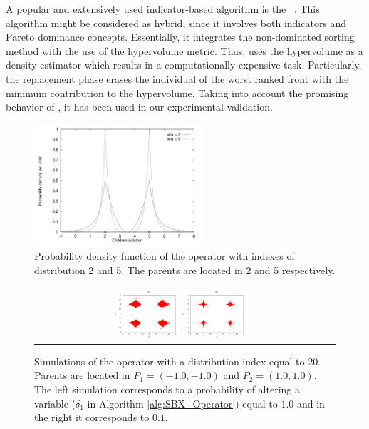 A popular and extensively used indicator-based algorithm is the \SMSEMOA{}~\cite{Joel:SMSEMOA}.
%
This algorithm might be considered as hybrid, since it involves both indicators and Pareto dominance concepts.
%
Essentially, it integrates the non-dominated sorting method with the use of the hypervolume metric.
%
Thus, \SMSEMOA{} uses the hypervolume as a density estimator which results in a computationally expensive task.
%
Particularly, the replacement phase erases the individual of the worst ranked front with the minimum contribution to the hypervolume.
%
Taking into account the promising behavior of \SMSEMOA{}, it has been used in our experimental validation.
%

\begin{figure}[!t]
\centering
\includegraphics[width=2.5in]{img/Operadores/DensitySBX_English.png}
\caption{Probability density function of the \SBX{} operator with indexes of distribution 2 and 5. The parents are located in 2 and 5 respectively.}
\label{fig:fig_sim}
\end{figure}

\begin{figure}[t]
\centering
\begin{tabular}{cc}
   \includegraphics[width=0.23\textwidth]{img/Operadores/SBX_eta_20_2D_pv_1.png} 
   \includegraphics[width=0.23\textwidth]{img/Operadores/SBX_eta_20_2D_pv_01.png} 
\end{tabular}
\caption{Simulations of the \SBX{} operator with a distribution index equal to 20. Parents are located in $P_1=(-1.0, -1.0)$ and $P_2=(1.0, 1.0)$. The left simulation corresponds to a probability of altering a variable ($\delta_1$ in Algorithm \ref{alg:SBX_Operator}) equal to $1.0$ and in the right it corresponds to $0.1$.}
\label{fig:Simulation_pv}
\end{figure}



